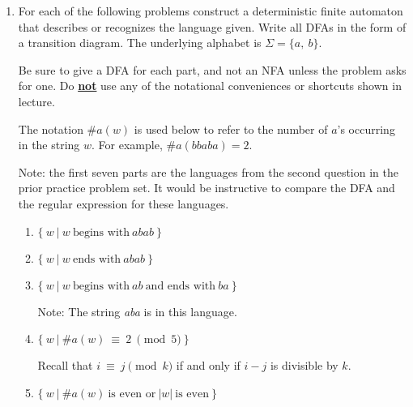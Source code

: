 \documentclass[11pt]{article}
\begin{document}

  \begin{enumerate}

    \addtolength{\itemsep}{30mm}

    \item For each of the following problems construct a deterministic
          finite automaton that describes or recognizes the language given.
          Write all DFAs in the form of a transition diagram.  The
          underlying alphabet is $\Sigma = \{a, \: b\}$.

          Be sure to give a DFA for each part, and not an NFA unless the
          problem asks for one.  Do \textbf{\underline{not}} use any of the
          notational conveniences or shortcuts shown in lecture.

          The notation $\#a(w)$ is used below to refer to the number of
          $a$'s occurring in the string $w$.  For example, $\#a(bbaba) = 2$.

          Note: the first seven parts are the languages from the second
          question in the prior practice problem set.  It would be
          instructive to compare the DFA and the regular expression for
          these languages.

          \vspace{-1.5mm}

          \begin{enumerate}

            \addtolength{\itemsep}{3mm}

            \item $ \{ \: w\ | \ w \ \textrm{begins with} \ abab\: \} $

            \item $ \{ \: w\ | \ w \ \textrm{ends with} \ abab\: \} $

            \item $ \{ \: w\ | \ w \ \textrm{begins with} \ ab \
                    \textrm{and ends with} \ ba\: \} $

                  Note: The string \textit{aba\/} is in this language.

            \item $ \{ \: w\ | \ \#a(w) \: \equiv \: 2 \ \pmod{5} \: \}$

                  Recall that $i \: \equiv \: j \pmod{k}$ if and only if
                  $i - j$ is divisible by $k$.

            \item $ \{ \: w\ | \ \#a(w) \ \textrm{is even or} \
                    |w| \ \textrm{is even} \: \} $


\end{enumerate}
\end{enumerate}
\end{document}
